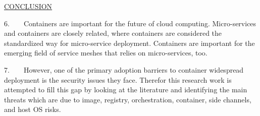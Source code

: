 \documentclass[12pt,a4paper]{article}
\begin{document}
\underline{CONCLUSION}



6.\ \ \ \ Containers are important for the future of cloud computing. 
Micro-services and containers are closely related, where containers are 
considered the standardized way for micro-service deployment. Containers 
are important for the emerging field of service meshes that relies on 
micro-services, too.



7.\ \ \ \ However, one of the primary adoption barriers to container 
widespread deployment is the security issues they face. Therefor this 
research work is attempted to fill this gap by looking at the literature 
and identifying the main threats which are due to image, registry, 
orchestration, container, side channels, and host OS risks.
\end{document}
